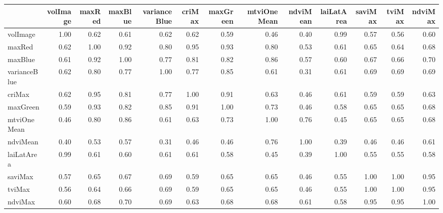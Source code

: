 \begin{tabular}{lrrrrrrrrrrrr}
\toprule
{} &  volImage &  maxRed &  maxBlue &  varianceBlue &  criMax &  maxGreen &  mtviOneMean &  ndviMean &  laiLatArea &  saviMax &  tviMax &  ndviMax \\
\midrule
volImage     &      1.00 &    0.62 &     0.61 &          0.62 &    0.62 &      0.59 &         0.46 &      0.40 &        0.99 &     0.57 &    0.56 &     0.60 \\
maxRed       &      0.62 &    1.00 &     0.92 &          0.80 &    0.95 &      0.93 &         0.80 &      0.53 &        0.61 &     0.65 &    0.64 &     0.68 \\
maxBlue      &      0.61 &    0.92 &     1.00 &          0.77 &    0.81 &      0.82 &         0.86 &      0.57 &        0.60 &     0.67 &    0.66 &     0.70 \\
varianceBlue &      0.62 &    0.80 &     0.77 &          1.00 &    0.77 &      0.85 &         0.61 &      0.31 &        0.61 &     0.69 &    0.69 &     0.69 \\
criMax       &      0.62 &    0.95 &     0.81 &          0.77 &    1.00 &      0.91 &         0.63 &      0.46 &        0.61 &     0.59 &    0.59 &     0.63 \\
maxGreen     &      0.59 &    0.93 &     0.82 &          0.85 &    0.91 &      1.00 &         0.73 &      0.46 &        0.58 &     0.65 &    0.65 &     0.68 \\
mtviOneMean  &      0.46 &    0.80 &     0.86 &          0.61 &    0.63 &      0.73 &         1.00 &      0.76 &        0.45 &     0.65 &    0.65 &     0.68 \\
ndviMean     &      0.40 &    0.53 &     0.57 &          0.31 &    0.46 &      0.46 &         0.76 &      1.00 &        0.39 &     0.46 &    0.46 &     0.61 \\
laiLatArea   &      0.99 &    0.61 &     0.60 &          0.61 &    0.61 &      0.58 &         0.45 &      0.39 &        1.00 &     0.55 &    0.55 &     0.58 \\
saviMax      &      0.57 &    0.65 &     0.67 &          0.69 &    0.59 &      0.65 &         0.65 &      0.46 &        0.55 &     1.00 &    1.00 &     0.95 \\
tviMax       &      0.56 &    0.64 &     0.66 &          0.69 &    0.59 &      0.65 &         0.65 &      0.46 &        0.55 &     1.00 &    1.00 &     0.95 \\
ndviMax      &      0.60 &    0.68 &     0.70 &          0.69 &    0.63 &      0.68 &         0.68 &      0.61 &        0.58 &     0.95 &    0.95 &     1.00 \\
\bottomrule
\end{tabular}
